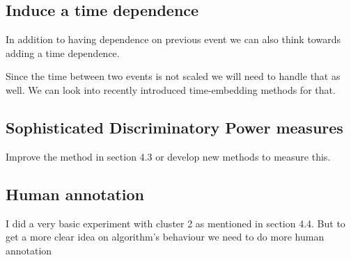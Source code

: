\documentclass{article}
\begin{document}
\subsection{Induce a time dependence}
In addition to having dependence on previous event we can also think towards adding a time dependence.

Since the time between two events is not scaled we will need to handle that as well. We can look into recently introduced time-embedding methods for that.

\subsection{Sophisticated Discriminatory Power measures}
Improve the method in section 4.3 or develop new methods to measure this.

\subsection{Human annotation}
I did a very basic experiment with cluster 2 as mentioned in section 4.4. But to get a more clear idea on algorithm's behaviour we need to do more human annotation



\end{document}
